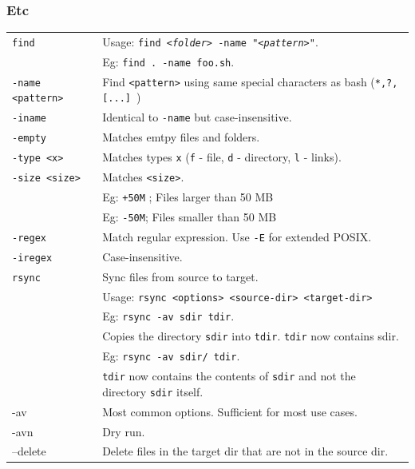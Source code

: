 \vfill\null
\columnbreak

\subsubsection{Etc}

\begin{tabularx}{\linewidth}{lX}
    \texttt{find}               & Usage: \texttt{find \textit{<folder>} -name "\textit{<pattern>}"}.\\
                                & Eg: \texttt{find . -name foo.sh}.\\
    \texttt{-name <pattern>}    & Find \texttt{<pattern>} using same special characters as bash (\texttt{*,?, [...] })\\
    \texttt{-iname}             & Identical to \texttt{-name} but case-insensitive.\\
    \texttt{-empty}             & Matches emtpy files and folders.\\
    \texttt{-type <x>}          & Matches types \texttt{x} (\texttt{f} - file, \texttt{d} - directory, \texttt{l} - links).\\
    \texttt{-size <size>}       & Matches \texttt{<size>}.\\
                                &  Eg: \texttt{+50M} ; Files larger than 50 MB\\
                                & Eg: \texttt{-50M}; Files smaller than 50 MB\\
    \texttt{-regex}             & Match regular expression. Use \texttt{-E} for extended POSIX.\\
    \texttt{-iregex}            & Case-insensitive.\\
    \hline

    \texttt{rsync}              & Sync files from source to target.\\
                                & Usage: \texttt{rsync <options> <source-dir> <target-dir>}\\
                                & Eg: \texttt{rsync -av sdir tdir}.\\
                                & Copies the directory \texttt{sdir} into \texttt{tdir}. \texttt{tdir} now contains sdir.\\
                                & Eg: \texttt{rsync -av sdir/ tdir}.\\
                                & \texttt{tdir} now contains the contents of \texttt{sdir} and not the directory \texttt{sdir} itself.\\
    -av                         & Most common options. Sufficient for most use cases.\\
    -avn                        & Dry run.\\
    --delete                    & Delete files in the target dir that are not in the source dir.\\
    \hline
    

\end{tabularx}
